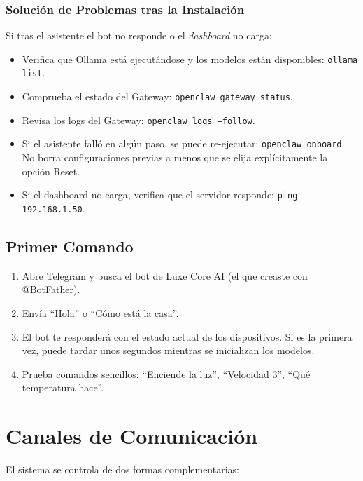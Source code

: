 \subsubsection*{Solución de Problemas tras la Instalación}

Si tras el asistente el bot no responde o el \textit{dashboard} no carga:

\begin{itemize}
    \item Verifica que Ollama está ejecutándose y los modelos están disponibles: \texttt{ollama list}.
    \item Comprueba el estado del Gateway: \texttt{openclaw gateway status}.
    \item Revisa los logs del Gateway: \texttt{openclaw logs --follow}.
    \item Si el asistente falló en algún paso, se puede re-ejecutar: \texttt{openclaw onboard}. No borra configuraciones previas a menos que se elija explícitamente la opción Reset.
    \item Si el dashboard no carga, verifica que el servidor responde: \texttt{ping 192.168.1.50}.
\end{itemize}

\subsection{Primer Comando}

\begin{enumerate}
    \item Abre Telegram y busca el bot de Luxe Core AI (el que creaste con @BotFather).
    \item Envía ``Hola'' o ``Cómo está la casa''.
    \item El bot te responderá con el estado actual de los dispositivos. Si es la primera vez, puede tardar unos segundos mientras se inicializan los modelos.
    \item Prueba comandos sencillos: ``Enciende la luz'', ``Velocidad 3'', ``Qué temperatura hace''.
\end{enumerate}

\section{Canales de Comunicación}

El sistema se controla de dos formas complementarias:


